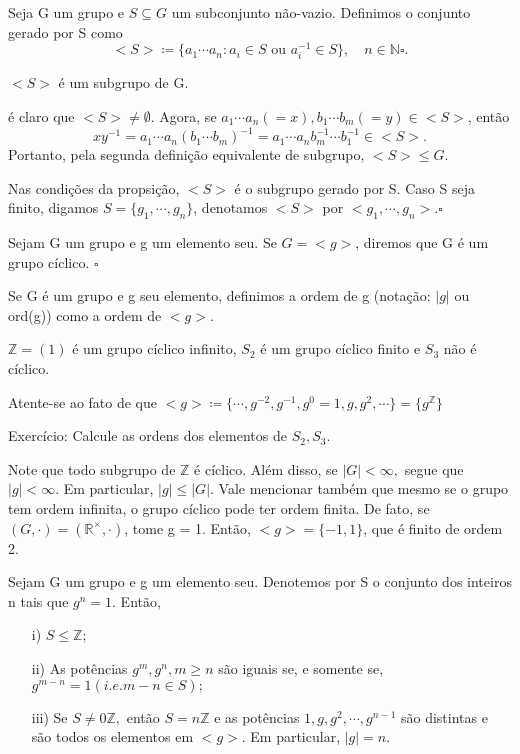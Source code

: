 \documentclass[Algebra/algebra_notes.tex]{subfiles}
\begin{document}
\begin{def*}
	Seja G um grupo e $S\subseteq{G}$ um subconjunto não-vazio. Definimos o conjunto gerado por S como
	$$
		<S>\coloneqq \biggl\{a_{1}\cdots a_{n}: a_{i}\in S\text{ ou }a_{i}^{-1}\in{S}\biggr\}, \quad n\in \mathbb{N}\square.
	$$
\end{def*}
\begin{prop*}
	$<S>$ é um subgrupo de G.
\end{prop*}
\begin{proof*}
	é claro que $<S> \neq\emptyset$. Agora, se $a_{1}\cdots a_{n} (= x), b_{1}\cdots b_{m}(= y)\in <S>$, então
	$$
		xy^{-1} = a_{1} \cdots a_{n}(b_{1}\cdots b_{m})^{-1} = a_{1}\cdots a_{n}b_{m}^{-1}\cdots b_{1}^{-1}\in <S>.
	$$
	Portanto, pela segunda definição equivalente de subgrupo, $<S>\leq{G}.$ \qedsymbol
\end{proof*}
\begin{def*}
	Nas condições da propsição, $<S>$ é o subgrupo gerado por S. Caso S seja finito, digamos $S=\{g_{1},\cdots, g_{n}\}$, denotamos
	$<S>$ por $<g_{1}, \cdots, g_{n}>.\square$
\end{def*}
\begin{def*}
	Sejam G um grupo e g um elemento seu. Se $G=<g>$, diremos que G é um grupo cíclico. $\square$
\end{def*}
\begin{def*}
	Se G é um grupo e g seu elemento, definimos a ordem de g (notação: $|g|$ ou ord(g)) como a ordem de $<g>$.
\end{def*}
\begin{example*}
	$\mathbb{Z} = (1)$ é um grupo cíclico infinito, $S_{2}$ é um grupo cíclico finito e $S_{3}$ não é cíclico. \qedsymbol
\end{example*}
Atente-se ao fato de que $<g>\coloneqq\{\cdots, g^{-2}, g^{-1}, g^{0}=1, g, g^{2}, \cdots\} = \{g^{\mathbb{Z}}\} $
\begin{example*}
	Exercício: Calcule as ordens dos elementos de $S_{2}, S_{3}.$
\end{example*}
Note que todo subgrupo de $\mathbb{Z}$ é cíclico. Além disso, se $|G|<\infty,$ segue que $|g|<\infty$. Em particular,
$|g|\leq{|G|}$. Vale mencionar também que mesmo se o grupo tem ordem infinita, o grupo cíclico pode ter ordem finita. De fato,
se $(G, \cdot) = (\mathbb{R}^{\times}, \cdot)$, tome g = 1. Então, $<g> = \{-1, 1\}$, que é finito de ordem 2.
\begin{prop*}
	Sejam G um grupo e g um elemento seu. Denotemos por S o conjunto dos inteiros n tais que $g^{n} = 1.$ Então,
	\begin{itemize}
		\item[i)]$S\leq{\mathbb{Z}}$;
		\item[ii)]As potências $g^{m}, g^{n}, m\geq{n}$ são iguais se, e somente se, $g^{m-n} = 1(i.e. m-n\in S);$
		\item[iii)] Se $S\neq0 \mathbb{Z},$ então $S=n\mathbb{Z}$ e as potências $1, g, g^{2}, \cdots, g^{n-1}$ são distintas e
		      são todos os elementos em $<g>.$ Em particular, $|g|=n.$
	\end{itemize}
\end{prop*}
\end{document}
